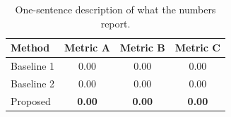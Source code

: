 \begin{table}[H]
  \centering
  \caption{One-sentence description of what the numbers report.}
  \label{tab:short-key}
  \begin{tabular}{lccc}
    \toprule
    Method        & Metric A & Metric B & Metric C \\
    \midrule
    Baseline 1    & 0.00     & 0.00     & 0.00     \\
    Baseline 2    & 0.00     & 0.00     & 0.00     \\
    Proposed      & \textbf{0.00} & \textbf{0.00} & \textbf{0.00} \\
    \bottomrule
  \end{tabular}
\end{table}
